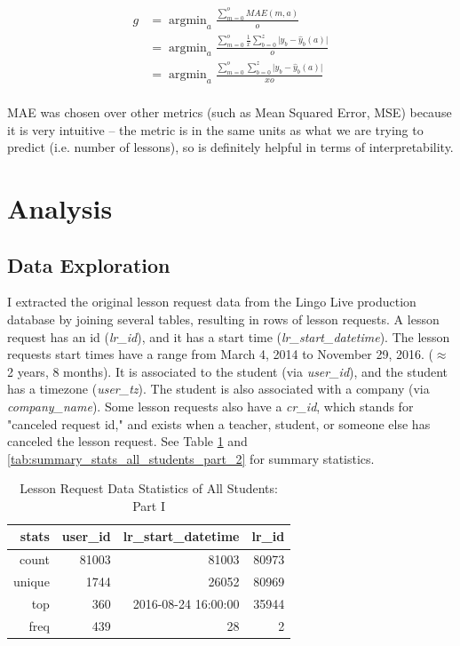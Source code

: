 \documentclass[oneside]{article}
\DeclareMathOperator*{\argmin}{argmin}
\begin{document}
\begin{align}
  g &= \argmin_{a}{\frac{ \sum_{m=0}^{o}{MAE(m,a)} }{o}}\\
  &= \argmin_{a}{\frac{ \sum_{m=0}^{o}{ \frac{1}{x}\sum_{b=0}^{z}{\lvert y_{b} - \hat{y}_{b}(a) \rvert} } }{o}}\\
  &= \argmin_{a}{\frac{ \sum_{m=0}^{o}{ \sum_{b=0}^{z}{\lvert y_{b} - \hat{y}_{b}(a) \rvert} } }{xo}}\\
\end{align}

MAE was chosen over other metrics (such as Mean Squared Error, MSE) because it is
very intuitive -- the metric is in the same units as what we are trying to
predict (i.e. number of lessons), so is definitely helpful in terms of
interpretability.

\section{Analysis}

\subsection{Data Exploration}

I extracted the original lesson request data from the Lingo Live production
database by joining several tables, resulting in rows of lesson requests. A
lesson request has an id (\emph{lr\_id}), and it has a start time
(\emph{lr\_start\_datetime}). The lesson requests start times have a range from
March 4, 2014 to November 29, 2016. ($\approx$ 2 years, 8 months).  It is
associated to the student (via \emph{user\_id}), and the student has a timezone
(\emph{user\_tz}). The student is also associated with a company (via
\emph{company\_name}).  Some lesson requests also have a \emph{cr\_id}, which
stands for "canceled request id," and exists when a teacher, student, or
someone else has canceled the lesson request. See Table
\ref{tab:summary_stats_all_students_part_1} and
\ref{tab:summary_stats_all_students_part_2} for summary statistics.

\begin{table}[]
  \centering
  \caption{Lesson Request Data Statistics of All Students: Part I}
  \label{tab:summary_stats_all_students_part_1}
  \begin{tabular}{rrrr}
    \hline
    \textbf{stats} & \textbf{user\_id} & \textbf{lr\_start\_datetime} & \textbf{lr\_id} \\
    \hline
    count   & 81003   & 81003    & 80973   \\
    unique    & 1744   & 26052    & 80969  \\
    top    & 360   & 2016-08-24 16:00:00   & 35944 \\
    freq    & 439   & 28    & 2   \\
    \hline
  \end{tabular}
\end{table}
\end{document}
